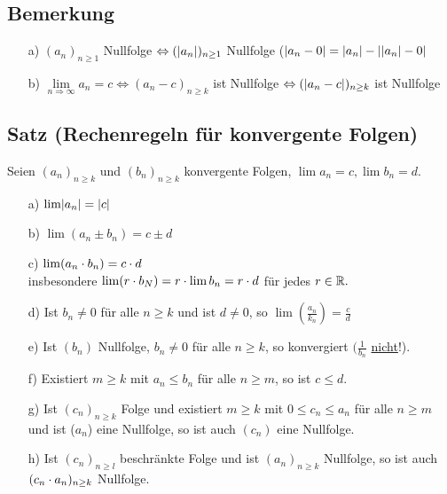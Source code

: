 \subsection{Bemerkung}\label{sec:2.7}
\begin{enumerate}
\item[a)]$(a_n)_{n \geq 1}$ Nullfolge $\Leftrightarrow (\lvert a_n \rvert)_{n \geq 1}$ Nullfolge ($\lvert a_n - 0 \rvert = \lvert a_n \rvert - \lvert \lvert a_n \rvert-0 \rvert$
\item[b)]$\lim\limits_{n\Rightarrow\infty} a_n = c \Leftrightarrow (a_n -c)_{n \geq k}$ ist Nullfolge $\Leftrightarrow (\lvert a_n -c \rvert)_{n \geq k}$ ist Nullfolge
\end{enumerate}
\subsection{Satz (Rechenregeln f\"ur konvergente Folgen)}\label{sec:2.8}
Seien $(a_n)_{n \geq k}$ und $(b_n)_{n \geq k}$ konvergente Folgen, $\lim a_n = c, \lim b_n = d.$\\
\begin{enumerate}
\item[a)]$\lim \lvert a_n \rvert = \lvert c \rvert$
\item[b)]$\lim (a_n \pm b_n) = c \pm d$
\item[c)]$\lim (a_n \cdot b_n) = c \cdot d$\\
insbesondere $\lim(r \cdot b_N) = r \cdot \lim b_n = r \cdot d$ f\"ur jedes $r \in \mathbb{R}.$
\item[d)]Ist $b_n \not = 0$ f\"ur alle $n \geq k$ und ist $ d \not = 0$, so $\lim (\frac{a_n}{k_n}) = \frac{c}{d}$
\item[e)]Ist $(b_n)$ Nullfolge, $b_n \not = 0$ f\"ur alle $n \geq k$, so konvergiert $(\frac{1}{b_n}$ \underline{nicht}!).
\item[f)]Existiert $m \geq k$ mit $a_n \leq b_n$ f\"ur alle $n \geq m$, so ist $c \leq d$.
\item[g)] Ist $(c_n)_{n \geq k}$ Folge und existiert $ m \geq k$ mit $0 \leq c_n \leq a_n$ f\"ur alle $n \geq m$ und ist ($a_n$) eine Nullfolge, so ist auch $(c_n)$ eine Nullfolge.
\item[h)]Ist $(c_n)_{n \geq l}$ beschr\"ankte Folge und ist $(a_n)_{n \geq k}$ Nullfolge, so ist auch $(c_n \cdot a_n)_{n \geq k}$ Nullfolge.\\
\end{enumerate}
